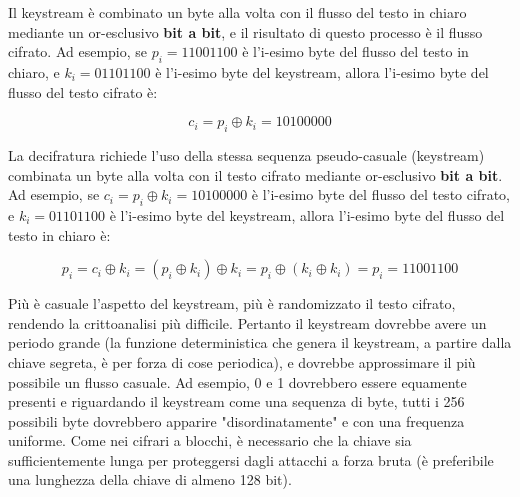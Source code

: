 Il keystream è combinato un byte alla volta con il flusso del testo in chiaro mediante un or-esclusivo \textbf{bit a bit}, e il risultato di questo processo è il flusso cifrato. Ad esempio, se $p_{i} = 11001100$ è l'i-esimo byte del flusso del testo in chiaro, e $k_{i} = 01101100$ è l'i-esimo byte del keystream, allora l'i-esimo byte del flusso del testo cifrato è:

\begin{equation}
	c_{i} = p_{i} \oplus k_{i} = 10100000
\end{equation}

La decifratura richiede l'uso della stessa sequenza pseudo-casuale (keystream) combinata un byte alla volta con il testo cifrato mediante or-esclusivo \textbf{bit a bit}. Ad esempio, se $c_{i} = p_{i} \oplus k_{i} = 10100000$ è l’i-esimo byte del flusso del testo cifrato, e $k_{i} = 01101100$ è l'i-esimo byte del keystream, allora l'i-esimo byte del flusso del testo in chiaro è: 

\begin{equation}
	p_{i} = c_{i} \oplus k_{i} = (p_{i} \oplus k_{i}) \oplus k_{i} = p_{i} \oplus (k_{i} \oplus k_{i}) = p_{i} = 11001100
\end{equation}

Più è casuale l'aspetto del keystream, più è randomizzato il testo cifrato, rendendo la crittoanalisi più difficile. Pertanto il keystream dovrebbe avere un periodo grande (la funzione deterministica che genera il keystream, a partire dalla chiave segreta, è per forza di cose periodica), e dovrebbe approssimare il più possibile un flusso casuale. Ad esempio, 0 e 1 dovrebbero essere equamente presenti e riguardando il keystream come una sequenza di byte, tutti i 256 possibili byte dovrebbero apparire "disordinatamente" e con una frequenza uniforme. Come nei cifrari a blocchi, è necessario che la chiave sia sufficientemente lunga per proteggersi dagli attacchi a forza bruta (è preferibile una lunghezza della chiave di almeno 128 bit).

